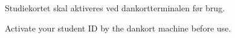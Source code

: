 \documentclass{article}
\begin{document}
\maketitle

\null

\vspace{-1cm}

\begin{center}


\vspace{-0.8cm}

\Huge

Studiekortet skal aktiveres ved dankortterminalen før brug.

\english


\vspace{-1.1cm}

Activate your student ID by the dankort machine before use.

\end{center}

\dansk

\underskriv
\end{document}
